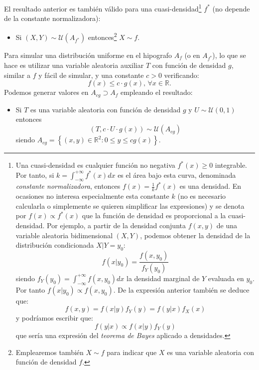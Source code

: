 \documentclass[
]{book}
\providecommand{\tightlist}{%
  \setlength{\itemsep}{0pt}\setlength{\parskip}{0pt}}
\theoremstyle{break}
\theoremstyle{nonumberplain}
\begin{document}
El resultado anterior es también válido para una cuasi-densidad\footnote{Una cuasi-densidad es cualquier función no negativa \(f^{\ast}(x) \geq 0\) integrable. Por tanto, si \(k = \int_{-\infty}^{+\infty}f^{\ast}(x)dx\) es el área bajo esta curva, denominada \emph{constante normalizadora}, entonces \(f(x) = \frac{1}{k}f^{\ast}(x)\) es una densidad.
  En ocasiones no interesa especialmente esta constante \(k\) (no es necesario calcularla o simplemente se quieren simplificar las expresiones) y se denota por \(f(x) \propto f^{\ast}(x)\) que la función de densidad es proporcional a la cuasi-densidad.
  Por ejemplo, a partir de la densidad conjunta \(f(x, y)\) de una variable aleatoria bidimensional \((X, Y)\), podemos obtener la densidad de la distribución condicionada \(X|Y=y_0\):
  \[f(x | y_0) = \frac{f(x, y_0)}{f_Y(y_0)}\]
  siendo \(f_Y(y_0) = \int_{-\infty}^{+\infty}f(x, y_0)dx\) la densidad marginal de \(Y\) evaluada en \(y_0\). Por tanto \(f(x | y_0) \propto f(x, y_0)\).
  De la expresión anterior también se deduce que:
  \[f(x, y) = f(x | y)f_Y(y) = f(y | x)f_X(x)\]
  y podríamos escribir que:
  \[f(y | x) \propto f(x | y)f_Y(y)\]
  que sería una expresión del \emph{teorema de Bayes} aplicado a densidades.} \(f^{\ast}\) (no depende de la constante normalizadora):

\begin{itemize}
\tightlist
\item
  Si \(\left( X,Y\right) \sim \mathcal{U}\left(A_{f^{\ast}}\right)\) entonces\footnote{Emplearemos también \(X\sim f\) para indicar que \(X\) es una variable aleatoria con función de densidad \(f\).} \(X\sim f\).
\end{itemize}

Para simular una distribución uniforme en el hipografo \(A_{f}\) (o en \(A_{f^{\ast}}\)), lo que se hace es utilizar una variable aleatoria auxiliar \(T\) con función de densidad \(g\), similar a \(f\) y fácil de simular, y una constante \(c > 0\) verificando:
\[f(x) \leq c\cdot g(x) \text{, }\forall x\in \mathbb{R}.\]
Podemos generar valores en \(A_{cg} \supset A_{f}\) empleando el resultado:

\begin{itemize}
\tightlist
\item
  Si \(T\) es una variable aleatoria con función de densidad \(g\)
  y \(U \sim \mathcal{U}(0, 1)\) entonces
  \[\left( T,c\cdot U\cdot g(x) \right) \sim \mathcal{U}\left(
  A_{cg}\right)\]
  siendo
  \(A_{cg}=\left\{ \left( x, y \right) \in \mathbb{R}^{2} : 0 \leq y \leq cg\left( x \right) \right\}\).
\end{itemize}
\end{document}
